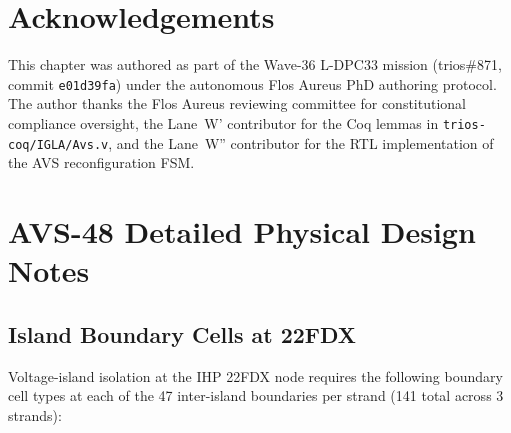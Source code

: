 \section*{Acknowledgements}

This chapter was authored as part of the Wave-36 L-DPC33 mission
(trios\#871, commit \texttt{e01d39fa}) under the autonomous Flos Aureus
PhD authoring protocol.  The author thanks the Flos Aureus reviewing
committee for constitutional compliance oversight, the Lane~W' contributor
for the Coq lemmas in \texttt{trios-coq/IGLA/Avs.v}, and the
Lane~W'' contributor for the RTL implementation of the AVS
reconfiguration FSM.

%

\appendix

\section{AVS-48 Detailed Physical Design Notes}
\label{app:physical_design}

\subsection{Island Boundary Cells at 22FDX}

Voltage-island isolation at the IHP 22FDX node requires the following
boundary cell types at each of the 47 inter-island boundaries per strand
(141 total across 3 strands):


